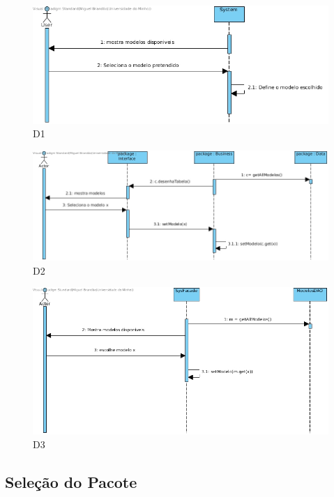 \begin{figure}[H]
    \centering
    \includegraphics[width=\textwidth]{diagramas_de_sequencia/imgs/UserSystemUC8D1.jpg}
    \caption{D1}
\end{figure}
\begin{figure}[H]
    \centering
    \includegraphics[width=\textwidth]{diagramas_de_sequencia/imgs/UserSystemUC8D2.jpg}
    \caption{D2}
\end{figure}
\begin{figure}[H]
    \centering
    \includegraphics[width=\textwidth]{diagramas_de_sequencia/imgs/UserSystemUC8D3.jpg}
    \caption{D3}
\end{figure}

\subsection{Seleção do Pacote}

